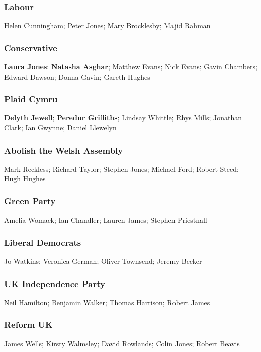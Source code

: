 \begin{resultsiii}

\subsubsection*{Labour}
Helen Cunningham; Peter Jones; Mary Brocklesby; Majid Rahman

\subsubsection*{Conservative}
\textbf{Laura Jones}; \textbf{Natasha Asghar}; Matthew Evans; Nick Evans; Gavin Chambers; Edward Dawson; Donna Gavin; Gareth Hughes

\subsubsection*{Plaid Cymru}
\textbf{Delyth Jewell}; \textbf{Peredur Griffiths}; Lindsay Whittle; Rhys Mills; Jonathan Clark; Ian Gwynne; Daniel Llewelyn

\subsubsection*{Abolish the Welsh Assembly}
Mark Reckless; Richard Taylor; Stephen Jones; Michael Ford; Robert Steed; Hugh Hughes

\subsubsection*{Green Party}
Amelia Womack; Ian Chandler; Lauren James; Stephen Priestnall

\subsubsection*{Liberal Democrats}
Jo Watkins; Veronica German; Oliver Townsend; Jeremy Becker

\subsubsection*{UK Independence Party}
Neil Hamilton; Benjamin Walker; Thomas Harrison; Robert James

\subsubsection*{Reform UK}
James Wells; Kirsty Walmsley; David Rowlands; Colin Jones; Robert Beavis


\end{resultsiii}
